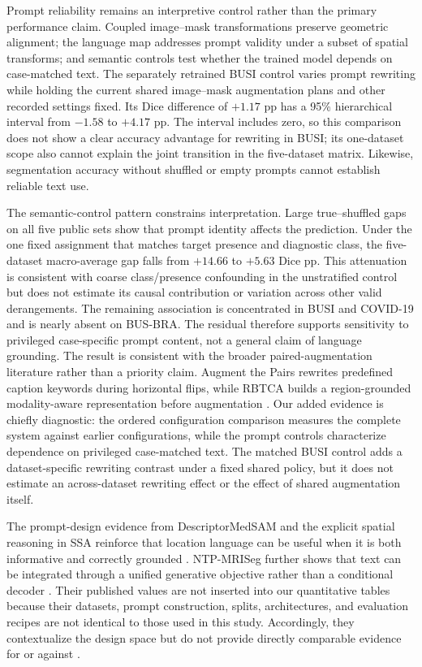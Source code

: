 Prompt reliability remains an interpretive control rather than the primary
performance claim. Coupled image--mask transformations preserve geometric alignment; the language
map addresses prompt validity under a subset of spatial transforms; and semantic
controls test whether the trained model depends on case-matched text. The
separately retrained BUSI control varies prompt rewriting while holding the
current shared image--mask augmentation plans and other recorded settings fixed.
Its Dice difference of $+1.17$ pp has a 95\% hierarchical interval from
$-1.58$ to $+4.17$ pp. The interval includes zero, so this comparison does not
show a clear accuracy advantage for rewriting in BUSI; its one-dataset scope
also cannot explain the joint transition in the five-dataset matrix. Likewise,
segmentation accuracy without shuffled or empty prompts cannot establish reliable
text use.

The semantic-control pattern constrains interpretation. Large true--shuffled
gaps on all five public sets show that prompt identity affects the prediction.
Under the one fixed assignment that matches target presence and diagnostic class,
the five-dataset macro-average gap falls from $+14.66$ to $+5.63$ Dice pp. This
attenuation is consistent with coarse class/presence confounding in the
unstratified control but does not estimate its causal contribution or variation
across other valid derangements. The remaining association is
concentrated in BUSI and COVID-19 and is nearly absent on BUS-BRA. The residual
therefore supports sensitivity to privileged case-specific prompt content, not
a general claim of language grounding.
The result is consistent with the broader paired-augmentation literature rather
than a priority claim. Augment the Pairs rewrites predefined caption keywords
during horizontal flips, while RBTCA builds a region-grounded modality-aware
representation before augmentation \cite{augmentpairs,rbtca}. Our added evidence
is chiefly diagnostic: the ordered configuration comparison measures the complete
system against earlier configurations, while the prompt controls characterize
dependence on privileged case-matched text. The matched BUSI control adds a
dataset-specific rewriting contrast under a fixed shared policy, but it does not
estimate an across-dataset rewriting effect or the effect of shared augmentation
itself.

The prompt-design evidence from DescriptorMedSAM and the explicit spatial
reasoning in SSA reinforce that location language can be useful when it is both
informative and correctly grounded \cite{descriptormedsam,ssa}. NTP-MRISeg
further shows that text can be integrated through a unified generative objective
rather than a conditional decoder \cite{ntpmriseg}. Their published values are
not inserted into our quantitative tables because their datasets, prompt
construction, splits, architectures, and evaluation recipes are not identical to
those used in this study. Accordingly, they contextualize the design space but
do not provide directly comparable evidence for or against \methodname{}.


